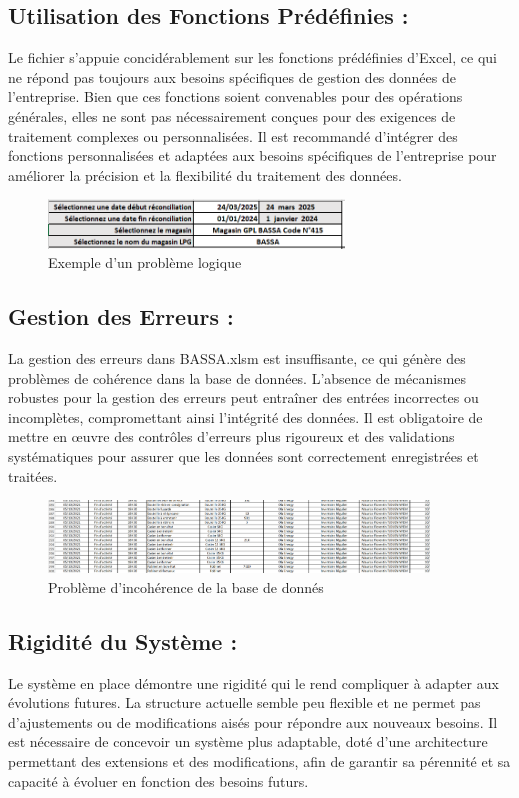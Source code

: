 \documentclass[a4paper, oneside, 12pt, final]{extreport}
\begin{document}
\subsection{Utilisation des Fonctions Prédéfinies :}
Le fichier s'appuie concidérablement sur les fonctions prédéfinies d'Excel, ce qui ne répond pas toujours aux besoins spécifiques de gestion des données de l'entreprise. Bien que ces fonctions soient convenables pour des opérations générales, elles ne sont pas nécessairement conçues pour des exigences de traitement complexes ou personnalisées. Il est recommandé d'intégrer des fonctions personnalisées et adaptées aux besoins spécifiques de l'entreprise pour améliorer la précision et la flexibilité du traitement des données.
\begin{figure}[h]
    \centering
    \includegraphics[width=0.7\textwidth]{Capture4.png} %
    \caption{Exemple d'un problème logique}
    \label{Exemple d'un problème logique}
\end{figure}

\subsection{Gestion des Erreurs :}
La gestion des erreurs dans BASSA.xlsm est insuffisante, ce qui génère des problèmes de cohérence dans la base de données. L'absence de mécanismes robustes pour la gestion des erreurs peut entraîner des entrées incorrectes ou incomplètes, compromettant ainsi l'intégrité des données. Il est obligatoire de mettre en œuvre des contrôles d'erreurs plus rigoureux et des validations systématiques pour assurer que les données sont correctement enregistrées et traitées.
\begin{figure}[h]
    \centering
    \includegraphics[width=0.9\textwidth]{Capture3.png} %
    \caption{Problème d'incohérence de la base de donnés}
    \label{fig:Problème d'incohérence de la base de donnés}
\end{figure}

\subsection{Rigidité du Système :}
Le système en place démontre une rigidité qui le rend compliquer à adapter aux évolutions futures. La structure actuelle semble peu flexible et ne permet pas d'ajustements ou de modifications aisés pour répondre aux nouveaux besoins. Il est nécessaire de concevoir un système plus adaptable, doté d'une architecture permettant des extensions et des modifications, afin de garantir sa pérennité et sa capacité à évoluer en fonction des besoins futurs.
\end{document}
